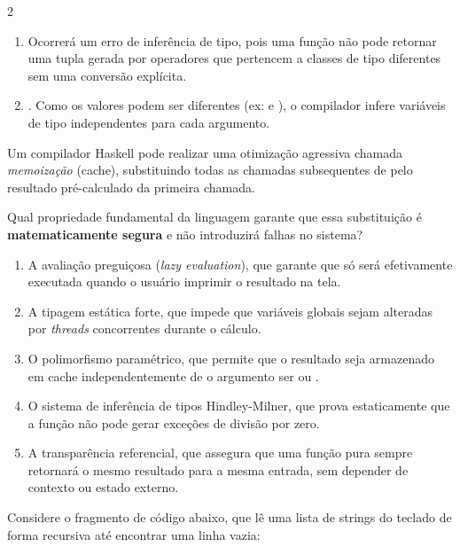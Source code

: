 \documentclass[a4paper,10pt,brazil]{article}
\begin{document}
\begin{multicols}{2}
\begin{enumerate}
  \item Ocorrerá um erro de inferência de tipo, pois uma função não pode retornar uma tupla gerada por operadores que pertencem a classes de tipo diferentes sem uma conversão explícita.

  \item {}. Como os valores podem ser diferentes (ex:  e ), o compilador infere variáveis de tipo independentes para cada argumento.


\end{enumerate}

Um compilador Haskell pode realizar uma otimização agressiva chamada \emph{memoização} (cache), substituindo todas as chamadas subsequentes de  pelo resultado pré-calculado da primeira chamada. 

Qual propriedade fundamental da linguagem garante que essa substituição é \textbf{matematicamente segura} e não introduzirá falhas no sistema?

\begin{enumerate}
  \item A avaliação preguiçosa (\emph{lazy evaluation}), que garante que  só será efetivamente executada quando o usuário imprimir o resultado na tela.

  \item A tipagem estática forte, que impede que variáveis globais sejam alteradas por \textit{threads} concorrentes durante o cálculo.

  \item O polimorfismo paramétrico, que permite que o resultado seja armazenado em cache independentemente de o argumento ser  ou .

  \item O sistema de inferência de tipos Hindley-Milner, que prova estaticamente que a função não pode gerar exceções de divisão por zero.

  \item A transparência referencial, que assegura que uma função pura sempre retornará o mesmo resultado para a mesma entrada, sem depender de contexto ou estado externo.


\end{enumerate}

Considere o fragmento de código abaixo, que lê uma lista de strings do teclado de forma recursiva até encontrar uma linha vazia:


\end{multicols}
\end{document}
